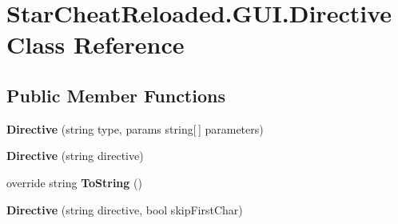 \hypertarget{class_star_cheat_reloaded_1_1_g_u_i_1_1_directive}{}\section{Star\+Cheat\+Reloaded.\+G\+U\+I.\+Directive Class Reference}
\label{class_star_cheat_reloaded_1_1_g_u_i_1_1_directive}
\subsection*{Public Member Functions}
\begin{DoxyCompactItemize}
\item 
{\bfseries Directive} (string type, params string\mbox{[}$\,$\mbox{]} parameters)\hypertarget{class_star_cheat_reloaded_1_1_g_u_i_1_1_directive_ad0205c669cfc7ccab78c5a7eca2a7fc7}{}\label{class_star_cheat_reloaded_1_1_g_u_i_1_1_directive_ad0205c669cfc7ccab78c5a7eca2a7fc7}

\item 
{\bfseries Directive} (string directive)\hypertarget{class_star_cheat_reloaded_1_1_g_u_i_1_1_directive_acb69c455a559c22b652d6504bb923147}{}\label{class_star_cheat_reloaded_1_1_g_u_i_1_1_directive_acb69c455a559c22b652d6504bb923147}

\item 
override string {\bfseries To\+String} ()\hypertarget{class_star_cheat_reloaded_1_1_g_u_i_1_1_directive_adee74ec55176ec4b8a2453fda72f1415}{}\label{class_star_cheat_reloaded_1_1_g_u_i_1_1_directive_adee74ec55176ec4b8a2453fda72f1415}

\item 
{\bfseries Directive} (string directive, bool skip\+First\+Char)\hypertarget{class_star_cheat_reloaded_1_1_g_u_i_1_1_directive_a7cecd5d34a0c81bd85536e5733d168db}{}\label{class_star_cheat_reloaded_1_1_g_u_i_1_1_directive_a7cecd5d34a0c81bd85536e5733d168db}

\end{DoxyCompactItemize}
